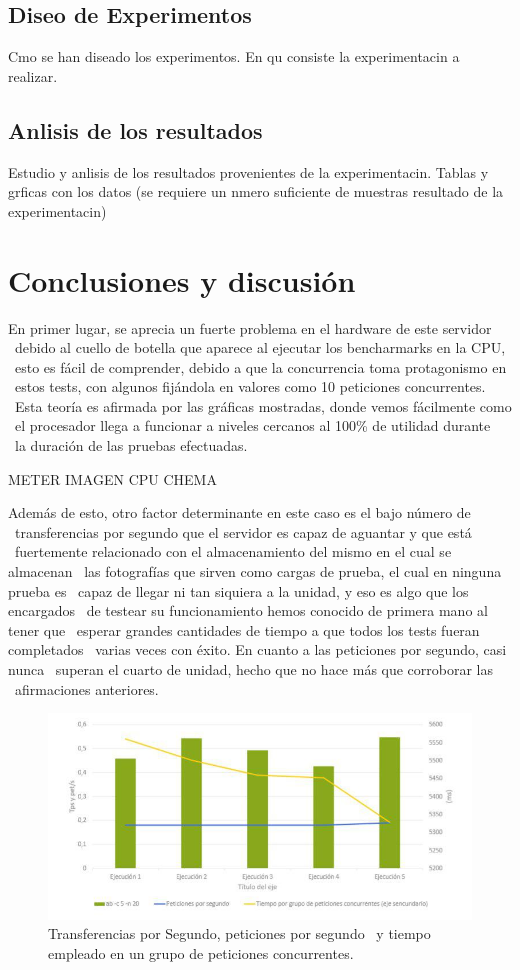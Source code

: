 \documentclass[11pt,twoside,a4paper]{book}
\begin{document}
\section{Diseo de Experimentos}
Cmo se han diseado los experimentos. En qu consiste la experimentacin a realizar.

\section{Anlisis de los resultados}
Estudio y anlisis de los resultados provenientes de la experimentacin. Tablas y grficas con los datos (se requiere un nmero suficiente de muestras resultado de la experimentacin)

\chapter{Conclusiones y discusión}

En primer lugar, se aprecia un fuerte problema en el hardware de este servidor \
debido al cuello de botella que aparece al ejecutar los bencharmarks en la CPU, \
esto es fácil de comprender, debido a que la concurrencia toma protagonismo en \
estos tests, con algunos fijándola en valores como 10 peticiones concurrentes. \
Esta teoría es afirmada por las gráficas mostradas, donde vemos fácilmente como \
el procesador llega a funcionar a niveles cercanos al 100\% de utilidad durante \
la duración de las pruebas efectuadas.

METER IMAGEN CPU CHEMA

Además de esto, otro factor determinante en este caso es el bajo número de \
transferencias por segundo que el servidor es capaz de aguantar y que está \
fuertemente relacionado con el almacenamiento del mismo en el cual se almacenan \
las fotografías que sirven como cargas de prueba, el cual en ninguna prueba es \
capaz de llegar ni tan siquiera a la unidad, y eso es algo que los encargados \
de testear su funcionamiento hemos conocido de primera mano al tener que \
esperar grandes cantidades de tiempo a que todos los tests fueran completados \
varias veces con éxito. En cuanto a las peticiones por segundo, casi nunca \
superan el cuarto de unidad, hecho que no hace más que corroborar las \
afirmaciones anteriores.

\begin{figure}
   \includegraphics[width=\textwidth]{grafica1.jpg}
   \caption{Transferencias por Segundo, peticiones por segundo \
   y tiempo empleado en un grupo de peticiones concurrentes.}
   \label{Fig1}
\end{figure}
\end{document}
